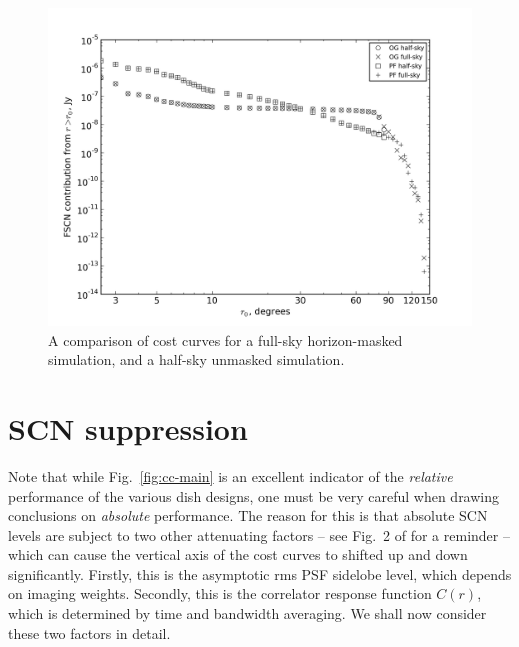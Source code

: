 \documentclass{aa}
\begin{document}
\begin{figure}
  \includegraphics[width=\columnwidth]{cc-horizonmasked}\hfill
\caption{\label{fig:cc-hm}A comparison of cost curves for a full-sky horizon-masked simulation, and a half-sky unmasked simulation.}
\end{figure}

\section{SCN suppression}

Note that while Fig.~\ref{fig:cc-main} is an excellent indicator of the \emph{relative} performance of the various dish designs, one must be very careful when drawing conclusions on \emph{absolute} performance. The reason for this is that absolute SCN levels are subject to two other attenuating factors -- see Fig.~2 of \citet{SKA54-expa,SKA54} for a reminder -- which can cause the vertical axis of the cost curves to shifted up and down significantly. Firstly, this is the asymptotic rms PSF sidelobe level, which depends on imaging weights. Secondly, this is the correlator response function $C(r)$, which is determined by time and bandwidth averaging. We shall now consider these two factors in detail.
\end{document}
